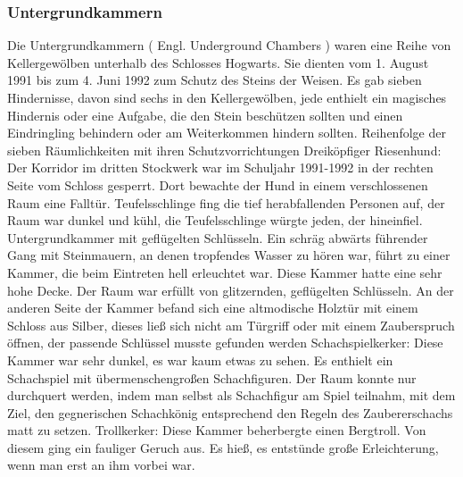 \documentclass[a4paper, 10pt]{article}
\begin{document}
\subsubsection*{\large Untergrundkammern}
Die Untergrundkammern (  Engl.  Underground Chambers ) waren eine Reihe von Kellergewölben unterhalb des Schlosses Hogwarts. Sie dienten vom 1. August 1991 bis zum 4. Juni 1992 zum Schutz des Steins der Weisen. Es gab sieben Hindernisse, davon sind sechs in den Kellergewölben, jede enthielt ein magisches Hindernis oder eine Aufgabe, die den Stein beschützen sollten und einen Eindringling behindern oder am Weiterkommen hindern sollten.
\vspace{10pt}
\newline
{}  
Reihenfolge der sieben Räumlichkeiten mit ihren Schutzvorrichtungen
\vspace{10pt}
\newline
{}  
Dreiköpfiger Riesenhund: Der Korridor im dritten Stockwerk war im Schuljahr 1991-1992 in der rechten Seite vom Schloss gesperrt. Dort bewachte der Hund in einem verschlossenen Raum eine Falltür.
Teufelsschlinge fing die tief herabfallenden Personen auf, der Raum war dunkel und kühl, die Teufelsschlinge würgte jeden, der hineinfiel.
\vspace{10pt}
\newline
{}  
Untergrundkammer mit geflügelten Schlüsseln. Ein schräg abwärts führender Gang mit Steinmauern, an denen tropfendes Wasser zu hören war, führt zu einer Kammer, die beim Eintreten hell erleuchtet war. Diese Kammer hatte eine sehr hohe Decke. Der Raum war erfüllt von glitzernden, geflügelten Schlüsseln. An der anderen Seite der Kammer befand sich eine altmodische Holztür mit einem Schloss aus Silber, dieses ließ sich nicht am Türgriff oder mit einem Zauberspruch öffnen, der passende Schlüssel musste gefunden werden
\vspace{10pt}
\newline
{}  
Schachspielkerker: Diese Kammer war sehr dunkel, es war kaum etwas zu sehen. Es enthielt ein Schachspiel mit übermenschengroßen Schachfiguren. Der Raum konnte nur durchquert werden, indem man selbst als Schachfigur am Spiel teilnahm, mit dem Ziel, den gegnerischen Schachkönig entsprechend den Regeln des Zaubererschachs matt zu setzen.
\vspace{10pt}
\newline
{}  
Trollkerker: Diese Kammer beherbergte einen Bergtroll. Von diesem ging ein fauliger Geruch aus. Es hieß, es entstünde große Erleichterung, wenn man erst an ihm vorbei war.
\end{document}
